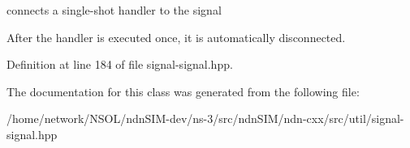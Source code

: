 connects a single-\/shot handler to the signal 

After the handler is executed once, it is automatically disconnected. 

Definition at line 184 of file signal-\/signal.\+hpp.



The documentation for this class was generated from the following file\+:\begin{DoxyCompactItemize}
\item 
/home/network/\+N\+S\+O\+L/ndn\+S\+I\+M-\/dev/ns-\/3/src/ndn\+S\+I\+M/ndn-\/cxx/src/util/signal-\/signal.\+hpp\end{DoxyCompactItemize}
